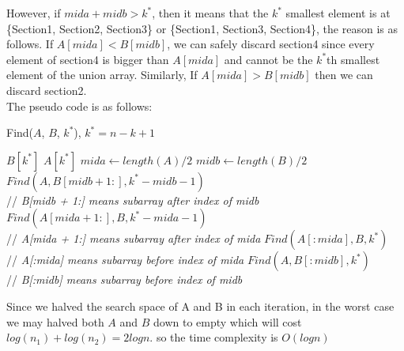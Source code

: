 However, if $mida + midb > k^{*}$, then it means that the $k^*$ smallest element is at \{Section1, Section2, Section3\} or \{Section1, Section3, Section4\}, the reason is as follows. If $A[mida] < B[midb]$, we can safely discard section4 since every element of section4 is bigger than $A[mida]$ and cannot be the $k^{*}$th smallest element of the union array. Similarly, If $A[mida] > B[midb]$ then we can discard section2.\\

The pseudo code is as follows:\\
[10cm]

\begin{algorithm}
\caption{Find($A$, $B$, $k^{*}$), $k^{*} = n - k + 1$}\label{euclid}
\begin{algorithmic}
 \Return $B[k^{*}]$
\EndIf
{} \Return $A[k^{*}]$
\EndIf
\State $mida \gets length(A)/2$
\State $midb \gets length(B)/2$
	  $Find(A, B[midb + 1:], k^{*} - midb - 1)$\\
	// \textit{B[midb + 1:] means subarray after index of midb}
	\Else  $Find(A[mida + 1:], B, k^{*} - mida - 1)$\\
	// \textit{A[mida + 1:] means subarray after index of mida}
	\EndIf
\Else 
	  $Find(A[:mida], B, k^{*})$\\
	// \textit{A[:mida] means subarray before index of mida}
	\Else  $Find(A, B[:midb], k^{*})$\\
	// \textit{B[:midb] means subarray before index of midb}
	\EndIf
\EndIf
\end{algorithmic}
\end{algorithm}

Since we halved the search space of A and B in each iteration, in the worst case we may halved both $A$ and $B$ down to empty which will cost $log(n_1) + log(n_2) = 2logn$. so the time complexity is $O(logn)$
